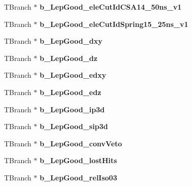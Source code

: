 \begin{DoxyCompactItemize}
\hypertarget{classMiniTree_a2955e0818d57e57cd94f61fa14487398}{}\label{classMiniTree_a2955e0818d57e57cd94f61fa14487398} 
T\+Branch $\ast$ {\bfseries b\+\_\+\+Lep\+Good\+\_\+ele\+Cut\+Id\+C\+S\+A14\+\_\+50ns\+\_\+v1}
\item 
\hypertarget{classMiniTree_a5d7553fe2857c2acac6c2167111c4003}{}\label{classMiniTree_a5d7553fe2857c2acac6c2167111c4003} 
T\+Branch $\ast$ {\bfseries b\+\_\+\+Lep\+Good\+\_\+ele\+Cut\+Id\+Spring15\+\_\+25ns\+\_\+v1}
\item 
\hypertarget{classMiniTree_a3b0572c6a2a8e7782855c2b4fb5faadd}{}\label{classMiniTree_a3b0572c6a2a8e7782855c2b4fb5faadd} 
T\+Branch $\ast$ {\bfseries b\+\_\+\+Lep\+Good\+\_\+dxy}
\item 
\hypertarget{classMiniTree_a566409766cf9a024da647ffeefcadffe}{}\label{classMiniTree_a566409766cf9a024da647ffeefcadffe} 
T\+Branch $\ast$ {\bfseries b\+\_\+\+Lep\+Good\+\_\+dz}
\item 
\hypertarget{classMiniTree_a9b260d861a8465648e8b8e63b7d58af2}{}\label{classMiniTree_a9b260d861a8465648e8b8e63b7d58af2} 
T\+Branch $\ast$ {\bfseries b\+\_\+\+Lep\+Good\+\_\+edxy}
\item 
\hypertarget{classMiniTree_a50cf2fa0afd9f46e7d9003ee6a104fc5}{}\label{classMiniTree_a50cf2fa0afd9f46e7d9003ee6a104fc5} 
T\+Branch $\ast$ {\bfseries b\+\_\+\+Lep\+Good\+\_\+edz}
\item 
\hypertarget{classMiniTree_a48a29bafe00b2eae85630b429645ea37}{}\label{classMiniTree_a48a29bafe00b2eae85630b429645ea37} 
T\+Branch $\ast$ {\bfseries b\+\_\+\+Lep\+Good\+\_\+ip3d}
\item 
\hypertarget{classMiniTree_a7ccb63f9c3b65230dda46290ea2ea925}{}\label{classMiniTree_a7ccb63f9c3b65230dda46290ea2ea925} 
T\+Branch $\ast$ {\bfseries b\+\_\+\+Lep\+Good\+\_\+sip3d}
\item 
\hypertarget{classMiniTree_ab1d3ce41f242ef652ce80b06ae8b3da9}{}\label{classMiniTree_ab1d3ce41f242ef652ce80b06ae8b3da9} 
T\+Branch $\ast$ {\bfseries b\+\_\+\+Lep\+Good\+\_\+conv\+Veto}
\item 
\hypertarget{classMiniTree_a88869347130de865d923b3c0cbd1175a}{}\label{classMiniTree_a88869347130de865d923b3c0cbd1175a} 
T\+Branch $\ast$ {\bfseries b\+\_\+\+Lep\+Good\+\_\+lost\+Hits}
\item 
\hypertarget{classMiniTree_a454ee778db79395355650cd9d8416b35}{}\label{classMiniTree_a454ee778db79395355650cd9d8416b35} 
T\+Branch $\ast$ {\bfseries b\+\_\+\+Lep\+Good\+\_\+rel\+Iso03}
\item 
\hypertarget{classMiniTree_aaa10f536e6e5d6b74373a26433521130}{}\label{classMiniTree_aaa10f536e6e5d6b74373a26433521130} 

\end{DoxyCompactItemize}
